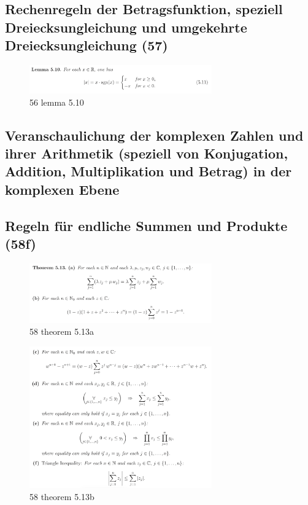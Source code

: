 \subsection{Rechenregeln der Betragsfunktion, speziell Dreiecksungleichung und umgekehrte Dreiecksungleichung (57)}

\begin{figure}[H]
	\centering
  \includegraphics[width=0.7\textwidth]{media/56-lemma-5-10.png}
	\caption{56 lemma 5.10}
\end{figure}

\subsection{Veranschaulichung der komplexen Zahlen und ihrer Arithmetik (speziell von Konjugation, Addition, Multiplikation und Betrag) in der komplexen Ebene}

\subsection{Regeln für endliche Summen und Produkte (58f)}

\begin{figure}[H]
	\centering
  \includegraphics[width=0.7\textwidth]{media/58-theorem-5-13a.png}
	\caption{58 theorem 5.13a}
	\label{58_theorem_5.13a}
\end{figure}

\begin{figure}[H]
	\centering
  \includegraphics[width=0.7\textwidth]{media/58-theorem-5-13b.png}
	\caption{58 theorem 5.13b}
	\label{58_theorem_5.13b}
\end{figure}